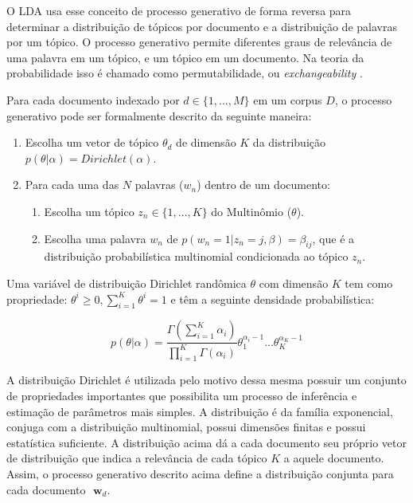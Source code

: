 \documentclass[12pt,a4paper]{article}
\begin{document}
 O LDA usa esse conceito de processo generativo de forma reversa para determinar a distribuição de tópicos por documento e a distribuição de palavras por um tópico. 
 O processo generativo permite diferentes graus de relevância de uma palavra em um tópico, e um tópico em um documento. Na teoria da probabilidade isso é chamado como permutabilidade,
 ou \textit{exchangeability} \cite{aldous1985exchangeability}. 
 
 Para cada documento indexado por $d \in \{1,. . . , M\}$ em um corpus $D$, o processo generativo pode ser formalmente descrito da seguinte maneira:


\begin{enumerate}
  \item Escolha um vetor de tópico $\theta _d$ de dimensão $K$ da distribuição $p(\theta|\alpha)=Dirichlet(\alpha)$.
  \item Para cada uma das $N$ palavras ($w_n$) dentro de um documento:
  \begin{enumerate}
  	\item Escolha um tópico \(z_n \in \{1,. . . , K\}\) do Multinômio ($\theta$).
    \item Escolha uma palavra $w_n$ de \(p(w_n=1| z_n=j,\beta)=\beta _{ij}\), que é a distribuição probabilística multinomial condicionada ao tópico $z_n$.
  \end{enumerate}
\end{enumerate}


Uma variável de distribuição Dirichlet randômica $\theta$ com dimensão $K$ tem como propriedade: $\theta ^i \geq 0, \displaystyle\sum_{i=1}^{K} \theta ^i = 1$ e têm a seguinte densidade probabilística:

\begin{equation}
p(\theta|\alpha) = \frac{\Gamma(\displaystyle\sum_{i=1}^{K} \alpha _i)}{\displaystyle\prod_{i=1}^{K} \Gamma(\alpha _i)} \theta _1 ^{\alpha _i - 1} ...  \theta _K ^{\alpha _K - 1}
\end{equation}

A distribuição Dirichlet é utilizada pelo motivo dessa mesma possuir um conjunto de propriedades importantes que possibilita um processo de inferência e estimação de parâmetros mais simples.
 A distribuição é da família exponencial, conjuga com a distribuição multinomial, possui dimensões finitas e possui estatística suficiente.
 A distribuição  acima dá a cada documento seu próprio vetor de distribuição que indica a relevância de cada tópico $K$ a aquele documento.
 Assim, o processo generativo descrito acima define a distribuição conjunta para cada documento $\textbf{ w}_d$.
\end{document}
